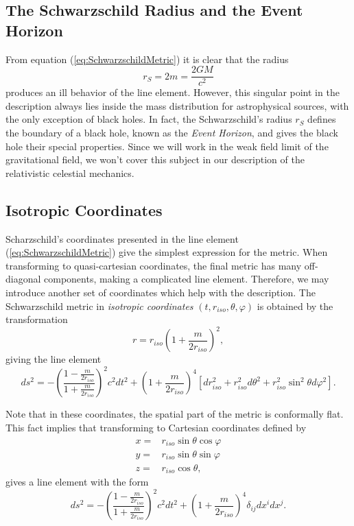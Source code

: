 \subsection{The Schwarzschild Radius and the Event Horizon}
From equation (\ref{eq:SchwarzschildMetric}) it is clear that the radius
\begin{equation}
r_S = 2m = \frac{2GM}{c^2}
\end{equation}
produces an ill behavior of the line element. However, this singular point in the description always lies inside the mass distribution for astrophysical sources, with the only exception of black holes. In fact, the Schwarzschild's radius $r_S$ defines the boundary of a black hole, known as the \textit{Event Horizon}, and gives the black hole their special properties. Since we will work in the weak field limit of the gravitational field,  we won't cover this subject in our description of the relativistic celestial mechanics.

\subsection{Isotropic Coordinates}
Scharzschild's coordinates presented in the line element (\ref{eq:SchwarzschildMetric}) give the simplest expression for the metric. When transforming to quasi-cartesian coordinates, the final metric has many off-diagonal components, making a complicated line element. Therefore, we may introduce another set of coordinates which help with the description. The Schwarzschild metric in \textit{isotropic coordinates} $(t, r_{iso}, \theta, \varphi)$ is obtained by the transformation
 \begin{equation}
 r = r_{iso} \left( 1 + \frac{m}{2r_{iso}}\right)^2 ,
 \end{equation}
giving the line element
\begin{equation}
 ds^2 = - \left( \frac{1 -  \frac{m}{2r_{iso}}}{1 + \frac{m}{2r_{iso}} } \right)^2 c^2 dt^2 + \left( 1+ \frac{m}{2r_{iso}} \right)^4 \left[ dr_{iso}^2  + r_{iso}^2 d\theta^2 + r_{iso}^2 \sin^2 \theta d\varphi^2 \right]. \label{eq:SchwIsotropic}
 \end{equation} 
 
Note that in these coordinates, the spatial part of the metric is conformally flat. This fact implies that transforming to Cartesian coordinates defined by
 \begin{subequations}
 \begin{align}
 x = &r_{iso} \sin \theta \cos \varphi \\
 y = &r_{iso} \sin \theta \sin \varphi \\
 z = &r_{iso} \cos \theta , 
 \end{align}
 \end{subequations}
 gives a line element with the form
 \begin{equation}
 ds^2 = - \left( \frac{1 -  \frac{m}{2r_{iso}}}{1 + \frac{m}{2r_{iso}} } \right)^2 c^2 dt^2 + \left( 1+ \frac{m}{2r_{iso}} \right)^4 \delta_{ij} dx^i dx^j. \label{eq:LineElementCartesianIsotropicicCoordinates}
 \end{equation}
 
